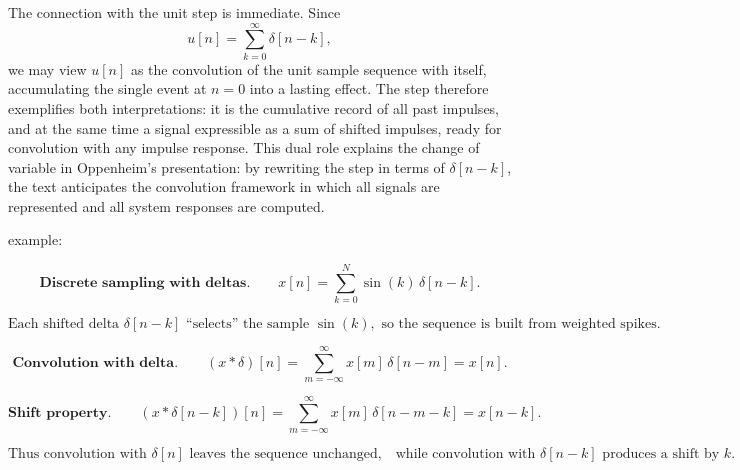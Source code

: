 \documentclass[12pt,a4paper]{article}
\begin{document}
	The connection with the unit step is immediate. Since
	$$
	u[n] = \sum_{k=0}^{\infty} \delta[n-k],
	$$
	we may view $u[n]$ as the convolution of the unit sample sequence with itself, accumulating the single event at $n=0$ into a lasting effect. The step therefore exemplifies both interpretations: it is the cumulative record of all past impulses, and at the same time a signal expressible as a sum of shifted impulses, ready for convolution with any impulse response. This dual role explains the change of variable in Oppenheim’s presentation: by rewriting the step in terms of $\delta[n-k]$, the text anticipates the convolution framework in which all signals are represented and all system responses are computed.
	
	example: \\
	\quad
	
	$$
	\textbf{Discrete sampling with deltas.}\qquad
	x[n] = \sum_{k=0}^{N} \sin(k)\,\delta[n-k].
	$$
	
	$$
	\text{Each shifted delta } \delta[n-k] \text{ ``selects'' the sample } \sin(k),
	\text{ so the sequence is built from weighted spikes.}
	$$
	
	$$
	\textbf{Convolution with delta.}\qquad
	(x * \delta)[n] = \sum_{m=-\infty}^{\infty} x[m]\,\delta[n-m] = x[n].
	$$
	
	$$
	\textbf{Shift property.}\qquad
	(x * \delta[n-k])[n] = \sum_{m=-\infty}^{\infty} x[m]\,\delta[n-m-k] = x[n-k].
	$$
	
	$$
	\text{Thus convolution with }\delta[n]\text{ leaves the sequence unchanged,}
	\quad \text{while convolution with }\delta[n-k]\text{ produces a shift by }k.
	$$
	
	
\end{document}
